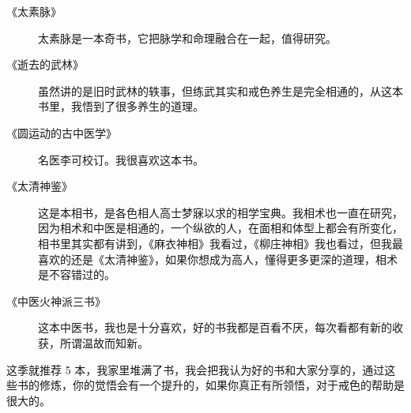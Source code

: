 \documentclass{ctexart}
\begin{document}
\begin{description}
    \item[《太素脉》] 太素脉是一本奇书，它把脉学和命理融合在一起，值得研究。
    \item[《逝去的武林》] 虽然讲的是旧时武林的轶事，但练武其实和戒色养生是完全相通的，从这本书里，我悟到了很多养生的道理。
    \item[《圆运动的古中医学》] 名医李可校订。我很喜欢这本书。
    \item[《太清神鉴》] 这是本相书，是各色相人高士梦寐以求的相学宝典。我相术也一直在研究，因为相术和中医是相通的，一个纵欲的人，在面相和体型上都会有所变化，相书里其实都有讲到，《麻衣神相》我看过，《柳庄神相》我也看过，但我最喜欢的还是《太清神鉴》，如果你想成为高人，懂得更多更深的道理，相术是不容错过的。
    \item[《中医火神派三书》] 这本中医书，我也是十分喜欢，好的书我都是百看不厌，每次看都有新的收获，所谓温故而知新。
\end{description}

这季就推荐 5 本，我家里堆满了书，我会把我认为好的书和大家分享的，通过这些书的修炼，你的觉悟会有一个提升的，如果你真正有所领悟，对于戒色的帮助是很大的。
\end{document}
